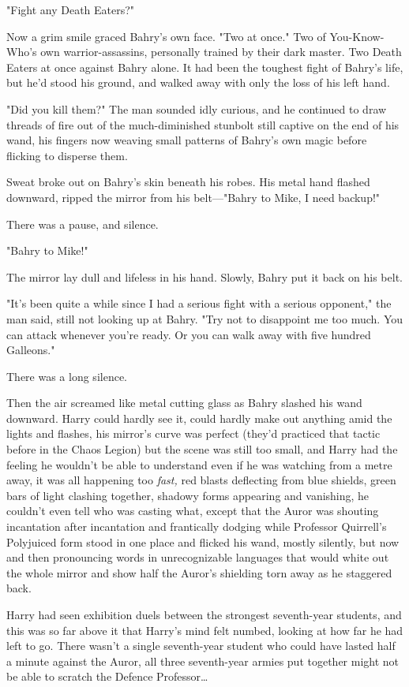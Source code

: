 "Fight any Death Eaters?"

Now a grim smile graced Bahry's own face. "Two at once." Two of You-Know-Who's
own warrior-assassins, personally trained by their dark master. Two Death
Eaters at once against Bahry alone. It had been the toughest fight of Bahry's
life, but he'd stood his ground, and walked away with only the loss of his left
hand.

"Did you kill them?" The man sounded idly curious, and he continued to draw
threads of fire out of the much-diminished stunbolt still captive on the end of
his wand, his fingers now weaving small patterns of Bahry's own magic before
flicking to disperse them.

Sweat broke out on Bahry's skin beneath his robes. His metal hand flashed
downward, ripped the mirror from his belt---"Bahry to Mike, I need backup!"

There was a pause, and silence.

"Bahry to Mike!"

The mirror lay dull and lifeless in his hand. Slowly, Bahry put it back on his
belt.

"It's been quite a while since I had a serious fight with a serious opponent,"
the man said, still not looking up at Bahry. "Try not to disappoint me too
much. You can attack whenever you're ready. Or you can walk away with five
hundred Galleons."

There was a long silence.

Then the air screamed like metal cutting glass as Bahry slashed his wand
downward.
\later
Harry could hardly see it, could hardly make out anything amid the lights and
flashes, his mirror's curve was perfect (they'd practiced that tactic before in
the Chaos Legion) but the scene was still too small, and Harry had the feeling
he wouldn't be able to understand even if he was watching from a metre away, it
was all happening too \emph{fast,} red blasts deflecting from blue shields,
green bars of light clashing together, shadowy forms appearing and vanishing,
he couldn't even tell who was casting what, except that the Auror was shouting
incantation after incantation and frantically dodging while Professor
Quirrell's Polyjuiced form stood in one place and flicked his wand, mostly
silently, but now and then pronouncing words in unrecognizable languages that
would white out the whole mirror and show half the Auror's shielding torn away
as he staggered back.

Harry had seen exhibition duels between the strongest seventh-year students,
and this was so far above it that Harry's mind felt numbed, looking at how far
he had left to go. There wasn't a single seventh-year student who could have
lasted half a minute against the Auror, all three seventh-year armies put
together might not be able to scratch the Defence Professor…

